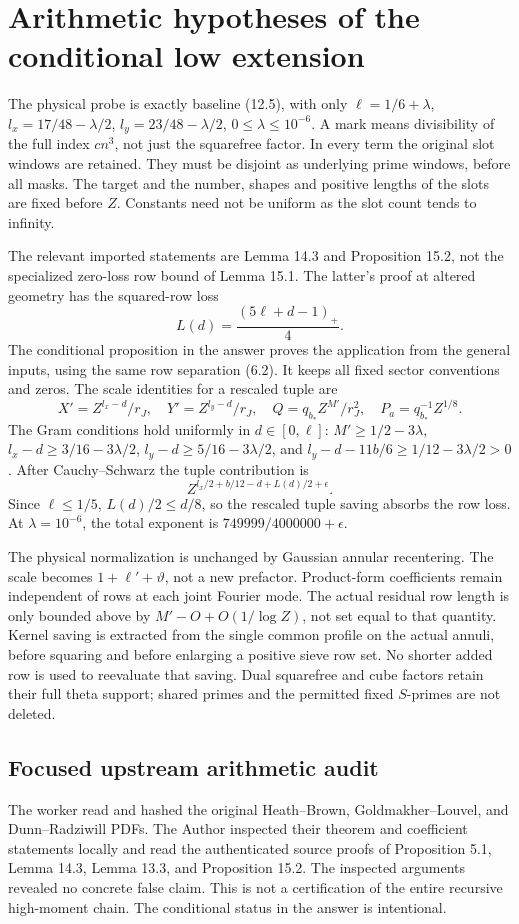 \documentclass[12pt]{article}
\begin{document}
\section{Arithmetic hypotheses of the conditional low extension}
The physical probe is exactly baseline (12.5), with only
\(\ell=1/6+\lambda\), \(l_x=17/48-\lambda/2\),
\(l_y=23/48-\lambda/2\), \(0\le\lambda\le10^{-6}\).
A mark means divisibility of the full index \(cn^3\), not just the
squarefree factor.  In every term the original slot windows are retained.
They must be disjoint as underlying prime windows, before all masks.
The target and the number, shapes and positive lengths of the slots
are fixed before \(Z\).  Constants need not be uniform as the slot
count tends to infinity.

The relevant imported statements are Lemma 14.3 and Proposition 15.2,
not the specialized zero-loss row bound of Lemma 15.1.  The latter's
proof at altered geometry has the squared-row loss
\[
 L(d)=\frac{(5\ell+d-1)_+}{4}.
\]
The conditional proposition in the answer proves the application
from the general inputs, using the same row separation (6.2).
It keeps all fixed sector conventions and zeros.  The scale identities
for a rescaled tuple are
\[
 X'=Z^{l_x-d}/r_J,\quad Y'=Z^{l_y-d}/r_J,\quad
 Q=q_{b_*}Z^{M'}/r_J^2,\quad P_a=q_{b_*}^{-1}Z^{1/8}.
\]
The Gram conditions hold uniformly in \(d\in[0,\ell]\):
\(M'\ge1/2-3\lambda\), \(l_x-d\ge3/16-3\lambda/2\),
\(l_y-d\ge5/16-3\lambda/2\), and
\(l_y-d-11b/6\ge1/12-3\lambda/2>0\).
After Cauchy--Schwarz the tuple contribution is
\[
 Z^{l_x/2+b/12-d+L(d)/2+\epsilon}.
\]
Since \(\ell\le1/5\), \(L(d)/2\le d/8\), so the rescaled tuple
saving absorbs the row loss.  At \(\lambda=10^{-6}\), the total
exponent is \(749999/4000000+\epsilon\).

The physical normalization is unchanged by Gaussian annular recentering.
The scale becomes \(1+\ell'+\vartheta\), not a new prefactor.
Product-form coefficients remain independent of rows at each joint
Fourier mode.  The actual residual row length is only bounded above
by \(M'-O+O(1/\log Z)\), not set equal to that quantity.  Kernel
saving is extracted from the single common profile on the actual
annuli, before squaring and before enlarging a positive sieve row set.
No shorter added row is used to reevaluate that saving.
Dual squarefree and cube factors retain their full theta support;
shared primes and the permitted fixed \(S\)-primes are not deleted.

\subsection{Focused upstream arithmetic audit}
The worker read and hashed the original Heath--Brown, Goldmakher--Louvel,
and Dunn--Radziwill PDFs.  The Author inspected their theorem and
coefficient statements locally and read the authenticated source proofs
of Proposition 5.1, Lemma 14.3, Lemma 13.3, and Proposition 15.2.
The inspected arguments revealed no concrete false claim.
This is not a certification of the entire recursive high-moment chain.
The conditional status in the answer is intentional.
\end{document}
